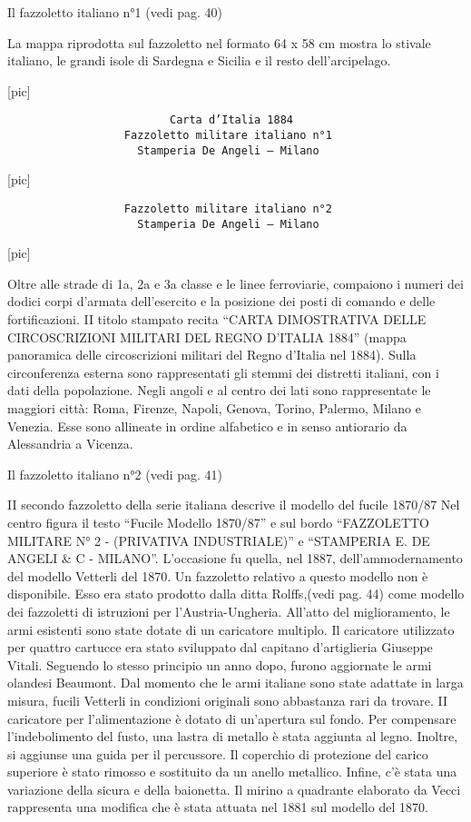 Il fazzoletto italiano n°1 (vedi pag. 40)

La mappa riprodotta sul fazzoletto nel formato 64 x 58 cm mostra lo
stivale italiano, le grandi isole di Sardegna e Sicilia e il resto
dell'arcipelago.

{[}pic{]}

\begin{verbatim}
                         Carta d’Italia 1884
                  Fazzoletto militare italiano n°1
                    Stamperia De Angeli – Milano
\end{verbatim}

{[}pic{]}

\begin{verbatim}
                  Fazzoletto militare italiano n°2
                    Stamperia De Angeli – Milano
\end{verbatim}

{[}pic{]}

Oltre alle strade di 1a, 2a e 3a classe e le linee ferroviarie,
compaiono i numeri dei dodici corpi d'armata dell'esercito e la
posizione dei posti di comando e delle fortificazioni. II titolo
stampato recita ``CARTA DIMOSTRATIVA DELLE CIRCOSCRIZIONI MILITARI DEL
REGNO D'ITALIA 1884'' (mappa panoramica delle circoscrizioni militari
del Regno d'Italia nel 1884). Sulla circonferenza esterna sono
rappresentati gli stemmi dei distretti italiani, con i dati della
popolazione. Negli angoli e al centro dei lati sono rappresentate le
maggiori città: Roma, Firenze, Napoli, Genova, Torino, Palermo, Milano e
Venezia. Esse sono allineate in ordine alfabetico e in senso antiorario
da Alessandria a Vicenza.

Il fazzoletto italiano n°2 (vedi pag. 41)

II secondo fazzoletto della serie italiana descrive il modello del
fucile 1870/87 Nel centro figura il testo ``Fucile Modello 1870/87'' e
sul bordo ``FAZZOLETTO MILITARE N° 2 - (PRIVATIVA INDUSTRIALE)'' e
``STAMPERIA E. DE ANGELI \& C - MILANO''. L'occasione fu quella, nel
1887, dell'ammodernamento del modello Vetterli del 1870. Un fazzoletto
relativo a questo modello non è disponibile. Esso era stato prodotto
dalla ditta Rolffs,(vedi pag. 44) come modello dei fazzoletti di
istruzioni per l'Austria-Ungheria. All'atto del miglioramento, le armi
esistenti sono state dotate di un caricatore multiplo. Il caricatore
utilizzato per quattro cartucce era stato sviluppato dal capitano
d'artiglieria Giuseppe Vitali. Seguendo lo stesso principio un anno
dopo, furono aggiornate le armi olandesi Beaumont. Dal momento che le
armi italiane sono state adattate in larga misura, fucili Vetterli in
condizioni originali sono abbastanza rari da trovare. II caricatore per
l'alimentazione è dotato di un'apertura sul fondo. Per compensare
l'indebolimento del fusto, una lastra di metallo è stata aggiunta al
legno. Inoltre, si aggiunse una guida per il percussore. Il coperchio di
protezione del carico superiore è stato rimosso e sostituito da un
anello metallico. Infine, c'è stata una variazione della sicura e della
baionetta. Il mirino a quadrante elaborato da Vecci rappresenta una
modifica che è stata attuata nel 1881 sul modello del 1870.

